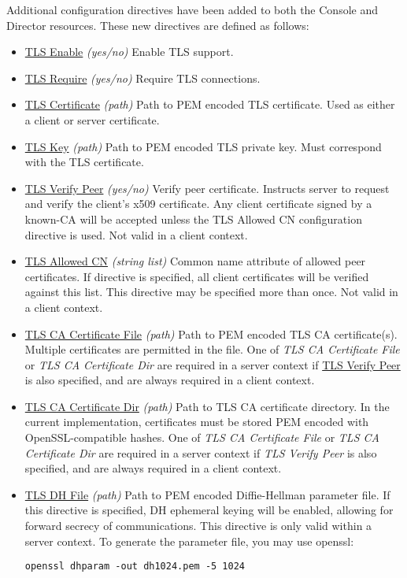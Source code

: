 Additional configuration directives have been added to both the Console and
Director resources.  These new directives are defined as follows:

\begin{itemize}
\item \underline{TLS Enable} \emph{(yes/no)}
Enable TLS support.

\item \underline{TLS Require} \emph{(yes/no)}
Require TLS connections.

\item \underline{TLS Certificate} \emph{(path)}
Path to PEM encoded TLS certificate.  Used as either a client or server
certificate.

\item \underline{TLS Key} \emph{(path)}
Path to PEM encoded TLS private key.  Must correspond with the TLS
certificate.

\item \underline{TLS Verify Peer} \emph{(yes/no)}
Verify peer certificate.  Instructs server to request and verify the
client's x509 certificate.  Any client certificate signed by a known-CA
will be accepted unless the TLS Allowed CN configuration directive is used.
Not valid in a client context.

\item \underline{TLS Allowed CN} \emph{(string list)}
Common name attribute of allowed peer certificates.  If directive is
specified, all client certificates will be verified against this list.
This directive may be specified more than once.  Not valid in a client
context.

\item \underline{TLS CA Certificate File} \emph{(path)}
Path to PEM encoded TLS CA certificate(s).  Multiple certificates are
permitted in the file.  One of \emph{TLS CA Certificate File} or \emph{TLS
CA Certificate Dir} are required in a server context if \underline{TLS
Verify Peer} is also specified, and are always required in a client
context.

\item \underline{TLS CA Certificate Dir} \emph{(path)}
Path to TLS CA certificate directory.  In the current implementation,
certificates must be stored PEM encoded with OpenSSL-compatible hashes.
One of \emph{TLS CA Certificate File} or \emph{TLS CA Certificate Dir} are
required in a server context if \emph{TLS Verify Peer} is also specified,
and are always required in a client context.

\item \underline{TLS DH File} \emph{(path)}
Path to PEM encoded Diffie-Hellman parameter file.  If this directive is
specified, DH ephemeral keying will be enabled, allowing for forward
secrecy of communications.  This directive is only valid within a server
context.  To generate the parameter file, you may use openssl:
\footnotesize
\begin{verbatim} 
openssl dhparam -out dh1024.pem -5 1024 
\end{verbatim}
\normalsize
\end{itemize}


